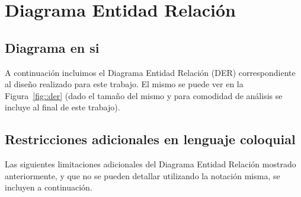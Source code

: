 \section{Diagrama Entidad Relaci\'on}

\subsection{Diagrama en si}

A continuaci\'on incluimos el Diagrama Entidad Relaci\'on (DER) correspondiente
al dise\~no realizado para este trabajo. El mismo se puede ver en la Figura~\ref{fig::der}
(dado el tama\~no del mismo y para comodidad de an\'alisis se incluye al final de este trabajo).

\subsection{Restricciones adicionales en lenguaje coloquial}

Las siguientes limitaciones adicionales del Diagrama Entidad Relaci\'on mostrado anteriormente,
y que no se pueden detallar utilizando la notaci\'on misma, se incluyen a continuaci\'on.


